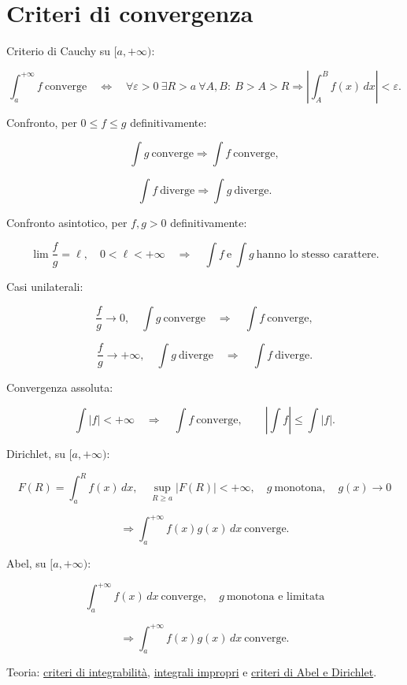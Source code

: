 \section{Criteri di convergenza}\label{criteri-di-convergenza}

Criterio di Cauchy su \([a,+\infty)\):

\[
\displaystyle
\int_a^{+\infty}f\ \text{converge}
\quad\Longleftrightarrow\quad
\forall\varepsilon>0\ \exists R>a\ \forall A,B:
\ B>A>R
\Longrightarrow
\left\lvert\int_A^B f(x)\,dx\right\rvert<\varepsilon.
\]

Confronto, per \(0\le f\le g\) definitivamente:

\[
\displaystyle
\int g\ \text{converge}
\Longrightarrow
\int f\ \text{converge},
\]

\[
\displaystyle
\int f\ \text{diverge}
\Longrightarrow
\int g\ \text{diverge}.
\]

Confronto asintotico, per \(f,g>0\) definitivamente:

\[
\displaystyle
\lim\frac{f}{g}=\ell,\quad 0<\ell<+\infty
\quad\Longrightarrow\quad
\int f\ \text{e}\ \int g\ \text{hanno lo stesso carattere}.
\]

Casi unilaterali:

\[
\displaystyle
\frac fg\to0,\quad \int g\ \text{converge}
\quad\Longrightarrow\quad
\int f\ \text{converge},
\]

\[
\displaystyle
\frac fg\to+\infty,\quad \int g\ \text{diverge}
\quad\Longrightarrow\quad
\int f\ \text{diverge}.
\]

Convergenza assoluta:

\[
\displaystyle
\int\lvert f\rvert<+\infty
\quad\Longrightarrow\quad
\int f\ \text{converge},
\qquad
\left\lvert\int f\right\rvert\le\int\lvert f\rvert.
\]

Dirichlet, su \([a,+\infty)\):

\[
\displaystyle
F(R)=\int_a^R f(x)\,dx,\quad
\sup_{R\ge a}\lvert F(R)\rvert<+\infty,\quad
g\ \text{monotona},\quad g(x)\to0
\]

\[
\displaystyle
\Longrightarrow
\int_a^{+\infty}f(x)g(x)\,dx\ \text{converge}.
\]

Abel, su \([a,+\infty)\):

\[
\displaystyle
\int_a^{+\infty}f(x)\,dx\ \text{converge},\quad
g\ \text{monotona e limitata}
\]

\[
\displaystyle
\Longrightarrow
\int_a^{+\infty}f(x)g(x)\,dx\ \text{converge}.
\]

Teoria: \href{https://ingegnerismo.it/matematica/criteri-di-integrabilita/}{criteri di integrabilità}, \href{https://ingegnerismo.it/matematica/integrali-impropri/}{integrali impropri} e \href{https://ingegnerismo.it/matematica/criteri-di-abel-e-dirichlet/}{criteri di Abel e Dirichlet}.
